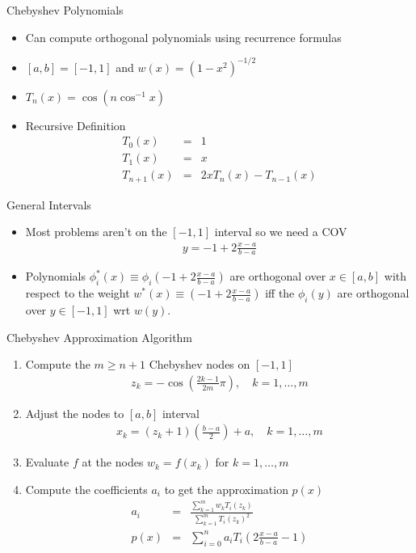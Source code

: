 \documentclass[xcolor=pdftex,dvipsnames,table,mathserif]{beamer}
\begin{document}
\begin{frame}{Chebyshev Polynomials}
\begin{itemize}
\item Can compute orthogonal polynomials using recurrence formulas
\item $[a,b] = [-1,1]$ and $w(x) = (1-x^2)^{-1/2}$
\item $T_n(x) = \cos(n \cos^{-1} x)$
\item Recursive Definition 
\begin{eqnarray*}
T_0(x) &=& 1\\
T_1(x) &=& x\\
T_{n+1}(x) &=& 2x T_n(x) - T_{n-1}(x)
\end{eqnarray*}
\end{itemize}
\begin{block}{General Intervals}
\begin{itemize}
\item Most problems aren't on the $[-1,1]$ interval so we need a COV
\begin{eqnarray*}
y = -1 + 2 \frac{x-a}{b-a}
\end{eqnarray*}
\item Polynomials $\phi_i^{*}(x) \equiv \phi_i (-1 + 2 \frac{x-a}{b-a})$ are orthogonal over $x \in[a,b]$ with respect to the weight $w^{*}(x) \equiv (-1 + 2 \frac{x-a}{b-a})$ iff the $\phi_i(y)$ are orthogonal over $y\in[-1,1]$ wrt $w(y)$.
\end{itemize} 
\end{block}
\end{frame}

\begin{frame}{Chebyshev Approximation Algorithm}
\begin{enumerate}
\item Compute the $m \geq n+1$ Chebyshev nodes on $[-1,1]$
\begin{eqnarray*}
z_k = -\cos \left ( \frac{2k-1}{2m} \pi \right) , \quad k=1,\ldots,m
\end{eqnarray*}
\item Adjust the nodes to $[a,b]$ interval
\begin{eqnarray*}
x_k = (z_k + 1)\left(\frac{b-a}{2} \right) + a , \quad k=1,\ldots,m
\end{eqnarray*}
\item Evaluate $f$ at the nodes $w_k = f(x_k)$ for $ k=1,\ldots,m$
\item Compute the coefficients $a_i$ to get the approximation $p(x)$
\begin{eqnarray*}
a_i &=& \frac{\sum_{k=1}^m w_k T_i(z_k)}{\sum_{k=1}^m  T_i(z_k)^2} \\
p(x) &=& \sum_{i=0}^n a_i T_i \left( 2 \frac{x-a}{b-a} -1 \right) 
\end{eqnarray*}
\end{enumerate}
\end{frame}
\end{document}
